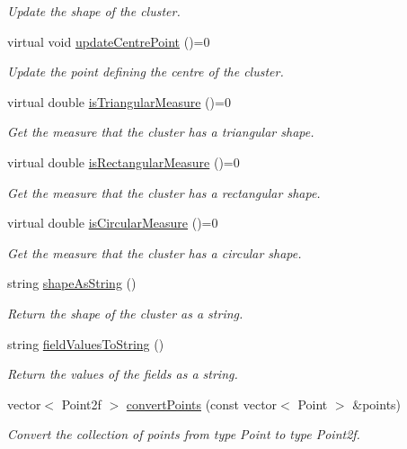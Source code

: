 \begin{DoxyCompactItemize}
\begin{DoxyCompactList}\small\item\em Update the shape of the cluster. \end{DoxyCompactList}\item 
virtual void \hyperlink{classmultiscale_1_1analysis_1_1SpatialEntityPseudo3D_a8e81fdb72e8510d8f77ce8b518a74843}{update\-Centre\-Point} ()=0
\begin{DoxyCompactList}\small\item\em Update the point defining the centre of the cluster. \end{DoxyCompactList}\item 
virtual double \hyperlink{classmultiscale_1_1analysis_1_1SpatialEntityPseudo3D_ac0e5bce32290f2595293bd7386e04de1}{is\-Triangular\-Measure} ()=0
\begin{DoxyCompactList}\small\item\em Get the measure that the cluster has a triangular shape. \end{DoxyCompactList}\item 
virtual double \hyperlink{classmultiscale_1_1analysis_1_1SpatialEntityPseudo3D_ad2984ec212e74437f3c7f3fc18ad555c}{is\-Rectangular\-Measure} ()=0
\begin{DoxyCompactList}\small\item\em Get the measure that the cluster has a rectangular shape. \end{DoxyCompactList}\item 
virtual double \hyperlink{classmultiscale_1_1analysis_1_1SpatialEntityPseudo3D_a31066d1038679f8e9080719380403cad}{is\-Circular\-Measure} ()=0
\begin{DoxyCompactList}\small\item\em Get the measure that the cluster has a circular shape. \end{DoxyCompactList}\item 
string \hyperlink{classmultiscale_1_1analysis_1_1SpatialEntityPseudo3D_a347c52b3cfad183a608ddbd018d8e409}{shape\-As\-String} ()
\begin{DoxyCompactList}\small\item\em Return the shape of the cluster as a string. \end{DoxyCompactList}\item 
string \hyperlink{classmultiscale_1_1analysis_1_1SpatialEntityPseudo3D_a232a5e4991e59dfc685107982fcaf0ce}{field\-Values\-To\-String} ()
\begin{DoxyCompactList}\small\item\em Return the values of the fields as a string. \end{DoxyCompactList}\item 
vector$<$ Point2f $>$ \hyperlink{classmultiscale_1_1analysis_1_1SpatialEntityPseudo3D_a2175fefa47f158b22872af80010543b1}{convert\-Points} (const vector$<$ Point $>$ \&points)
\begin{DoxyCompactList}\small\item\em Convert the collection of points from type Point to type Point2f. \end{DoxyCompactList}\end{DoxyCompactItemize}
